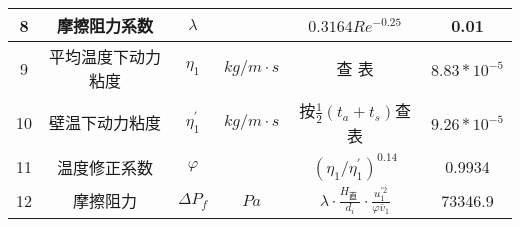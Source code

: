 \begin{table}[H]
{\begin{tabular}{|c|c|c|c|c|c|}
            8    & 摩擦阻力系数       & $ \lambda $        &                                                & $ 0.3164Re^{-0.25} $                                                                               & 0.01             \\ \hline
            9    & 平均温度下动力粘度 & $ \eta_{1} $       & $ kg/m \cdot s $                               & 查 表                                                                                              & $ 8.83*10^{-5} $ \\ \hline
            10   & 壁温下动力粘度     & $ \eta_{1}^{'} $   & $ kg/m \cdot s $                               & 按$ \frac{1}{2}(t_a + t_s) $查表                                                                   & $ 9.26*10^{-5} $ \\ \hline
            11   & 温度修正系数       & $ \varphi $        &                                                & $ \left(\eta_{1} / \eta_{1}^{\prime}\right)^{0.14} $                                               & 0.9934           \\ \hline
            12   & 摩擦阻力           & $ \Delta P_f $     & $ Pa $                                         & $ \lambda \cdot \frac{H_{\text {直 }}}{d_{i}} \cdot \frac{u_{1}^{\prime 2}}{\varphi \bar{v}_{1}} $ & 73346.9          \\ \hline
        \end{tabular}
    }
\end{table}

